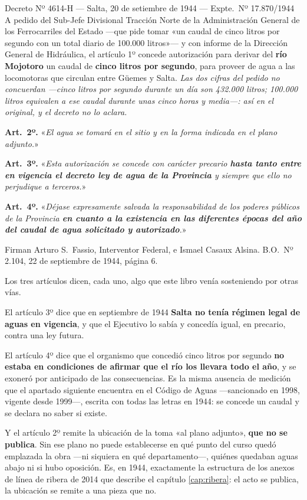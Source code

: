 \begin{ficha}{Decreto Nº 4614-H --- Salta, 20 de setiembre de 1944 --- Expte.\ Nº 17.870/1944}
A pedido del Sub-Jefe Divisional Tracción Norte de la Administración General de los
Ferrocarriles del Estado ---que pide tomar «un caudal de cinco litros por segundo con un
total diario de 100.000 litros»--- y con informe de la Dirección General de Hidráulica, el
artículo 1º concede autorización para derivar del \textbf{río Mojotoro} un caudal de
\textbf{cinco litros por segundo}, para proveer de agua a las locomotoras que circulan entre
Güemes y Salta. \textit{Las dos cifras del pedido no concuerdan ---cinco litros por segundo
durante un día son 432.000 litros; 100.000 litros equivalen a ese caudal durante unas cinco
horas y media---: así en el original, y el decreto no lo aclara.}

\textbf{Art.\ 2º.} «\textit{El agua se tomará en el sitio y en la forma indicada en el plano
adjunto.}»

\textbf{Art.\ 3º.} «\textit{Esta autorización se concede con carácter precario \textbf{hasta
tanto entre en vigencia el decreto ley de agua de la Provincia} y siempre que ello no perjudique
a terceros.}»

\textbf{Art.\ 4º.} «\textit{Déjase expresamente salvada la responsabilidad de los poderes
públicos de la Provincia \textbf{en cuanto a la existencia en las diferentes épocas del año del
caudal de agua solicitado y autorizado}.}»

Firman Arturo S.\ Fassio, Interventor Federal, e Ismael Casaux Alsina. B.O.\ Nº 2.104,
22 de septiembre de 1944, página 6.
\end{ficha}

Los tres artículos dicen, cada uno, algo que este libro venía sosteniendo por otras vías.

El artículo 3º dice que en septiembre de 1944 \textbf{Salta no tenía régimen legal de aguas en
vigencia}, y que el Ejecutivo lo sabía y concedía igual, en precario, contra una ley futura.

El artículo 4º dice que el organismo que concedió cinco litros por segundo \textbf{no estaba en
condiciones de afirmar que el río los llevara todo el año}, y se exoneró por anticipado de las
consecuencias. Es la misma ausencia de medición que el apartado siguiente encuentra en el
Código de Aguas ---sancionado en 1998, vigente desde 1999---, escrita con todas las letras en 1944: se concede un caudal y se declara no
saber si existe.

Y el artículo 2º remite la ubicación de la toma «al plano adjunto», \textbf{que no se publica}.
Sin ese plano no puede establecerse en qué punto del curso quedó emplazada la obra ---ni
siquiera en qué departamento---, quiénes quedaban aguas abajo ni si hubo oposición. Es, en
1944, exactamente la estructura de los anexos de línea de ribera de 2014 que describe el
capítulo \ref{cap:ribera}: el acto se publica, la ubicación se remite a una pieza que no.

